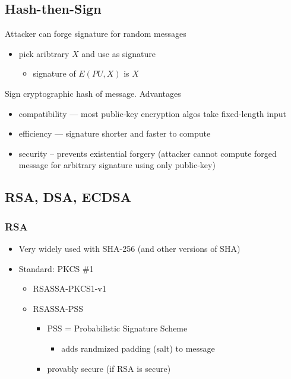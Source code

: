 \documentclass[draft]{article}
\begin{document}
\subsection{Hash-then-Sign}
Attacker can forge signature for random messages
\begin{itemize}[nosep]
    \item pick aribtrary $X$ and use as signature
          \begin{itemize}[nosep]\item signature of $E(PU, X)$ is $X$\end{itemize}
\end{itemize}
Sign cryptographic hash of message. Advantages
\begin{itemize}[nosep]
    \item compatibility --- most public-key encryption algos take fixed-length input
    \item efficiency --- signature shorter and faster to compute
    \item security -- prevents existential forgery (attacker cannot compute forged message for arbitrary signature using only public-key)
\end{itemize}
\subsection{RSA, DSA, ECDSA}
\subsubsection*{RSA}
\begin{itemize}[nosep]
    \item Very widely used with SHA-256 (and other versions of SHA)
    \item Standard: PKCS \#1
          \begin{itemize}[nosep]
              \item RSASSA-PKCS1-v1
              \item RSASSA-PSS
                    \begin{itemize}[nosep]
                        \item PSS = Probabilistic Signature Scheme
                              \begin{itemize}[nosep]\item adds randmized padding (salt) to message\end{itemize}
                        \item provably secure (if RSA is secure)
                    \end{itemize}
          \end{itemize}
\end{itemize}
\end{document}

